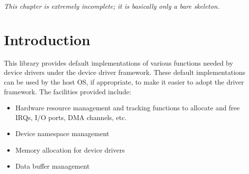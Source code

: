 %
% 
%
\label{libfdev}

\emph{This chapter is extremely incomplete;
it is basically only a bare skeleton.}


\section{Introduction}

This library provides default implementations
of various functions needed by device drivers
under the \oskit{} device driver framework.
These default implementations can be used by the host OS, if appropriate,
to make it easier to adopt the driver framework.
The facilities provided include:
\begin{itemize}
\item	Hardware resource management and tracking functions
	to allocate and free IRQs, I/O ports, DMA channels, etc.
\item	Device namespace management
\item	Memory allocation for device drivers
\item	Data buffer management
\end{itemize}


